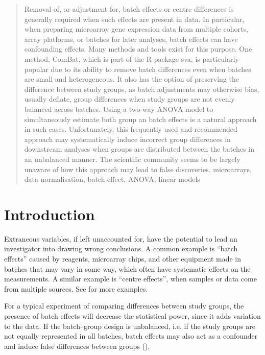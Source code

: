 \documentclass{bio}
\begin{document}
\begin{abstract}
{Removal of, or adjustment for, batch effects or centre differences is generally required when such effects are present in data. In particular, when preparing microarray gene expression data from multiple cohorts, array platforms, or batches for later analyses, batch effects can have confounding effects. Many methods and tools exist for this purpose. One method, ComBat, which is part of the R package sva, is particularly popular due to its ability to remove batch differences even when batches are small and heterogeneous. It also has the option of preserving the difference between study groups, as batch adjustments may otherwise bias, usually deflate, group differences when study groups are not evenly balanced across batches. Using a two-way ANOVA model to simultaneously estimate both group an batch effects is a natural approach in such cases. Unfortunately, this frequently used and recommended approach may systematically induce incorrect group differences in downstream analyses when groups are distributed between the batches in an unbalanced manner. The scientific community seems to be largely unaware of how this approach may lead to false discoveries.
}
microarrays, data normalisation, batch effect, ANOVA, linear models
\end{abstract}


\section{Introduction}\label{intro}

Extraneous variables, if left unaccounted for, have the potential to lead an investigator into drawing wrong conclusions. A common example is ``batch effects'' caused by reagents, microarray chips, and other equipment made in batches that may vary in some way, which often have systematic effects on the measurements. A similar example is ``centre effects'', when samples or data come from multiple sources. See \citet{Luo2010} for more examples.

For a typical experiment of comparing differences between study groups, the presence of batch effects will decrease the statistical power, since it adds variation to the data. If the batch--group design is unbalanced, i.e. if the study groups are not equally represented in all batches, batch effects may also act as a confounder and induce false differences between groups (\citealp{Leek2010}).
\end{document}

